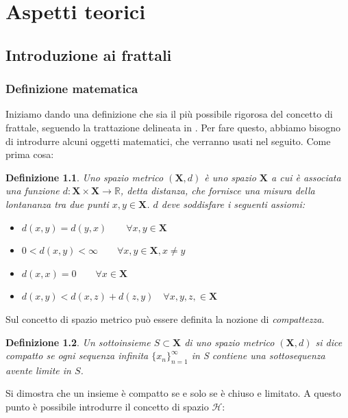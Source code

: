 \documentclass[11pt,a4paper,appendixprefix=true,numbers=noenddot]{scrreprt}
\newtheorem{definizione}{Definizione}
\begin{document}
\chapter{Aspetti teorici}

\section{Introduzione ai frattali}

\subsection*{Definizione matematica}

Iniziamo dando una definizione che sia il più possibile rigorosa del concetto di frattale, seguendo la trattazione delineata in \cite{barnsley}. Per fare questo, abbiamo bisogno di introdurre alcuni oggetti matematici, che verranno usati nel seguito. Come prima cosa:

\begin{definizione}
Uno spazio metrico $(\mathbf{X}, d)$ è uno spazio $\mathbf{X}$ a cui è associata una funzione $d: \mathbf{X} \times \mathbf{X} \rightarrow \mathbb{R}$, detta \emph{distanza}, che fornisce una misura della lontananza tra due punti $x, y \in \mathbf{X}$. $d$ deve soddisfare i seguenti assiomi:

\begin{itemize}
	\item $d(x,y) = d(y,x) \qquad \forall x, y \in \mathbf{X}$
	\item $0 < d(x,y) < \infty \qquad \forall x,y \in \mathbf{X}, x \neq y $
	\item $d(x,x) = 0 \qquad \forall x \in \mathbf{X} $
	\item $d(x, y) < d(x,z) + d(z, y) \quad \forall x, y, z, \in \mathbf{X} $
\end{itemize}
\end{definizione}

Sul concetto di spazio metrico può essere definita la nozione di \emph{compattezza}.

\begin{definizione}
Un sottoinsieme $S \subset \mathbf{X}$ di uno spazio metrico $(\mathbf{X}, d)$ si dice \emph{compatto} se ogni sequenza infinita $\{ x_n \}_{n=1}^{\infty}$ in S contiene una sottosequenza avente limite in $S$.
\end{definizione}

Si dimostra che un insieme è compatto se e solo se è chiuso e limitato. A questo punto è possibile introdurre il concetto di spazio $\mathcal{H}$:
\end{document}
